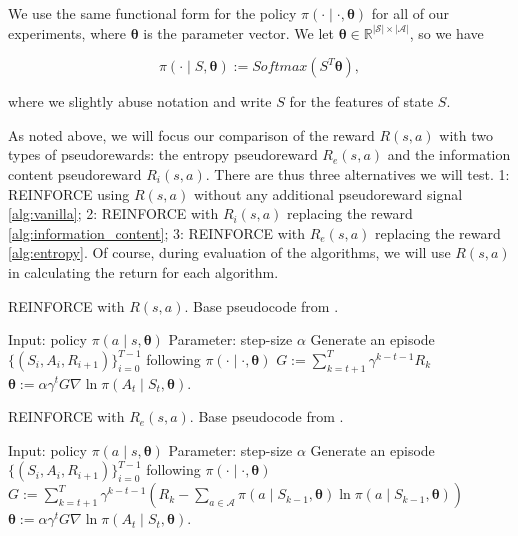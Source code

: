 \documentclass{article}
\begin{document}
  We use the same functional form for the policy $\pi(\cdot \mid \cdot, \bm{\theta})$ for all of our experiments, where $\bm{\theta}$ is the parameter vector. We let $\bm{\theta} \in \mathbb{R}^{|\mathcal{S}| \times |\mathcal{A}|}$, so we have

  \begin{equation*}
    \pi(\cdot \mid S, \bm{\theta}) :=  Softmax(S^T \bm{\theta}),
  \end{equation*}

  where we slightly abuse notation and write $S$ for the features of state $S$.

  As noted above, we will focus our comparison of the reward $R(s, a)$ with two types of pseudorewards: the entropy pseudoreward $R_e(s, a)$ and the information content pseudoreward $R_i(s, a)$. There are thus three alternatives we will test. 1: REINFORCE using $R(s, a)$ without any additional pseudoreward signal \ref{alg:vanilla}; 2: REINFORCE with $R_i(s, a)$ replacing the reward \ref{alg:information_content}; 3: REINFORCE with $R_e(s, a)$ replacing the reward \ref{alg:entropy}. Of course, during evaluation of the algorithms, we will use $R(s, a)$ in calculating the return for each algorithm.

  \begin{algorithm}
    \caption{REINFORCE with $R(s, a)$. Base pseudocode from \citet[p.328]{sutton2018reinforcement}.}
    \label{alg:vanilla}
    \begin{algorithmic}
      \State Input: policy $\pi(a \mid s, \bm{\theta})$
      \State Parameter: step-size $\alpha$
        \State Generate an episode $\{(S_i, A_i, R_{i + 1})\}_{i = 0}^{T - 1}$ following $\pi(\cdot \mid \cdot, \bm{\theta})$
          \State $G := \sum_{k = t + 1}^T \gamma^{k - t - 1} R_k$
          \State $\bm{\theta} := \alpha \gamma^t G \nabla \ln \pi(A_t \mid S_t, \bm{\theta})$.
        \EndFor
      \EndFor
    \end{algorithmic}
  \end{algorithm}

  \begin{algorithm}
    \caption{REINFORCE with $R_e(s, a)$. Base pseudocode from \citet[p.328]{sutton2018reinforcement}.}
    \label{alg:entropy}
    \begin{algorithmic}
      \State Input: policy $\pi(a \mid s, \bm{\theta})$
      \State Parameter: step-size $\alpha$
        \State Generate an episode $\{(S_i, A_i, R_{i + 1})\}_{i = 0}^{T - 1}$ following $\pi(\cdot \mid \cdot, \bm{\theta})$
          \State $G := \sum_{k = t + 1}^T \gamma^{k - t - 1} (R_k - \sum_{a \in \mathcal{A}} \pi(a \mid S_{k - 1}, \bm{\theta}) \ln \pi(a \mid S_{k - 1}, \bm{\theta}))$
          \State $\bm{\theta} := \alpha \gamma^t G \nabla \ln \pi(A_t \mid S_t, \bm{\theta})$.
        \EndFor
      \EndFor
    \end{algorithmic}
  \end{algorithm}
\end{document}
